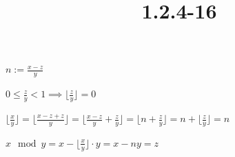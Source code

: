 \documentclass{article}
\title{1.2.4-16}
\begin{document}
\maketitle

\( n := \frac{x-z}{y} \)

\( 0 \leq \frac{z}{y} < 1 \implies \lfloor \frac{z}{y} \rfloor = 0 \)

\( \lfloor\frac{x}{y}\rfloor = \lfloor\frac{x-z+z}{y}\rfloor = \lfloor\frac{x-z}{y} + \frac{z}{y} \rfloor = \lfloor n + \frac{z}{y} \rfloor = n + \lfloor \frac{z}{y} \rfloor = n \)

\( x \mod y = x - \lfloor\frac{x}{y}\rfloor \cdot y = x - ny = z \)
\end{document}
